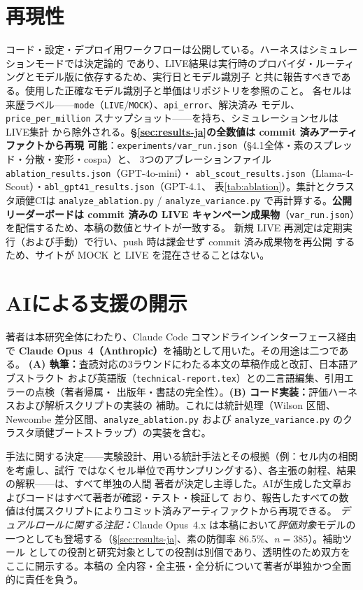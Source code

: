 \documentclass[11pt]{ltjsarticle}
\newcommand{\code}[1]{\texttt{#1}}
\begin{document}
\section{再現性}\label{sec:repro}
コード・設定・デプロイ用ワークフローは公開している。ハーネスはシミュレーションモードでは決定論的
であり、LIVE結果は実行時のプロバイダ・ルーティングとモデル版に依存するため、実行日とモデル識別子
と共に報告すべきである。使用した正確なモデル識別子と単価はリポジトリを参照のこと。
各セルは来歴ラベル——\code{mode}（\code{LIVE}/\code{MOCK}）、\code{api\_error}、解決済み
モデル、\code{price\_per\_million} スナップショット——を持ち、シミュレーションセルはLIVE集計
から除外される。\textbf{\S\ref{sec:results-ja}の全数値は commit 済みアーティファクトから再現
可能}：\code{experiments/var\_run.json}（\S4.1全体・素のスプレッド・分散・変形・cospa）と、
3つのアブレーションファイル \code{ablation\_results.json}（GPT-4o-mini）・
\code{abl\_scout\_results.json}（Llama-4-Scout）・\code{abl\_gpt41\_results.json}（GPT-4.1、
表\ref{tab:ablation}）。集計とクラスタ頑健CIは \code{analyze\_ablation.py} /
\code{analyze\_variance.py} で再計算する。\textbf{公開リーダーボードは commit 済みの LIVE
キャンペーン成果物}（\code{var\_run.json}）を配信するため、本稿の数値とサイトが一致する。
新規 LIVE 再測定は定期実行（および手動）で行い、push 時は課金せず commit 済み成果物を再公開
するため、サイトが MOCK と LIVE を混在させることはない。

\section*{AIによる支援の開示}
著者は本研究全体にわたり、Claude Code コマンドラインインターフェース経由で
\textbf{Claude Opus~4（Anthropic）}を補助として用いた。その用途は二つである。
\textbf{(A) 執筆：}査読対応の3ラウンドにわたる本文の草稿作成と改訂、日本語アブストラクト
および英語版（\code{technical-report.tex}）との二言語編集、引用エラーの点検（著者帰属・
出版年・書誌の完全性）。\textbf{(B) コード実装：}評価ハーネスおよび解析スクリプトの実装の
補助。これには統計処理（Wilson 区間、Newcombe 差分区間、\code{analyze\_ablation.py} および
\code{analyze\_variance.py} のクラスタ頑健ブートストラップ）の実装を含む。

手法に関する決定——実験設計、用いる統計手法とその根拠（例：セル内の相関を考慮し、試行
ではなくセル単位で再サンプリングする）、各主張の射程、結果の解釈——は、すべて単独の人間
著者が決定し主導した。AIが生成した文章およびコードはすべて著者が確認・テスト・検証して
おり、報告したすべての数値は付属スクリプトによりコミット済みアーティファクトから再現できる。
\emph{デュアルロールに関する注記：}Claude Opus~4.x は本稿において\emph{評価対象}モデルの
一つとしても登場する（\S\ref{sec:results-ja}、素の防御率 86.5\%、$n{=}385$）。補助ツール
としての役割と研究対象としての役割は別個であり、透明性のため双方をここに開示する。本稿の
全内容・全主張・全分析について著者が単独かつ全面的に責任を負う。
\end{document}
